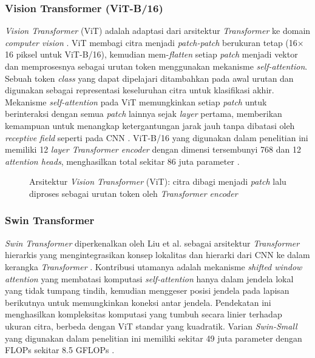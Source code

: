 \subsubsection{Vision Transformer (ViT-B/16)}
\textit{Vision Transformer} (ViT) adalah adaptasi dari arsitektur
\textit{Transformer} ke domain \textit{computer vision}
\cite{dosovitskiy2021image}. ViT membagi citra menjadi
\textit{patch-patch} berukuran tetap (16$\times$16 piksel untuk
ViT-B/16), kemudian mem-\textit{flatten} setiap \textit{patch} menjadi
vektor dan memprosesnya sebagai urutan token menggunakan mekanisme
\textit{self-attention}. Sebuah token \textit{class} yang dapat
dipelajari ditambahkan pada awal urutan dan digunakan sebagai representasi
keseluruhan citra untuk klasifikasi akhir. Mekanisme \textit{self-attention}
pada ViT memungkinkan setiap \textit{patch} untuk berinteraksi dengan
semua \textit{patch} lainnya sejak \textit{layer} pertama, memberikan
kemampuan untuk menangkap ketergantungan jarak jauh tanpa dibatasi oleh
\textit{receptive field} seperti pada CNN \cite{dosovitskiy2021image}.
ViT-B/16 yang digunakan dalam penelitian ini memiliki 12
\textit{layer Transformer encoder} dengan dimensi tersembunyi 768 dan
12 \textit{attention heads}, menghasilkan total sekitar 86 juta
parameter \cite{dosovitskiy2021image}. \par

\begin{figure}[h]
    \centering
    \fbox{\rule{0pt}{4cm}\rule{0.85\textwidth}{0pt}}
    \caption{Arsitektur \textit{Vision Transformer} (ViT): citra dibagi
    menjadi \textit{patch} lalu diproses sebagai urutan token oleh
    \textit{Transformer encoder} \cite{dosovitskiy2021image}}
    \label{fig:vit_architecture}
\end{figure}

\subsubsection{Swin Transformer}
\textit{Swin Transformer} diperkenalkan oleh Liu et al. sebagai
arsitektur \textit{Transformer} hierarkis yang mengintegrasikan konsep
lokalitas dan hierarki dari CNN ke dalam kerangka \textit{Transformer}
\cite{liu2021swin}. Kontribusi utamanya adalah mekanisme
\textit{shifted window attention} yang membatasi komputasi
\textit{self-attention} hanya dalam jendela lokal yang tidak tumpang
tindih, kemudian menggeser posisi jendela pada lapisan berikutnya
untuk memungkinkan koneksi antar jendela. Pendekatan ini menghasilkan
kompleksitas komputasi yang tumbuh secara linier terhadap ukuran citra,
berbeda dengan ViT standar yang kuadratik. Varian \textit{Swin-Small}
yang digunakan dalam penelitian ini memiliki sekitar 49 juta parameter
dengan FLOPs sekitar 8.5 GFLOPs \cite{liu2021swin}. \par

